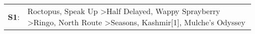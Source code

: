 \begin{supertabular}{p{0.03\textwidth}p{0.92\textwidth}}
 \textbf{S1}:  &  Roctopus\textsuperscript{}, \enspace Speak Up\textsuperscript{} \textgreater \enspace Half Delayed\textsuperscript{}, \enspace Wappy Sprayberry\textsuperscript{} \textgreater \enspace Ringo\textsuperscript{}, \enspace North Route\textsuperscript{} \textgreater \enspace Seasons\textsuperscript{}, \enspace Kashmir[1]\textsuperscript{}, \enspace Mulche's Odyssey\textsuperscript{}  \enspace  \\
\end{supertabular}
